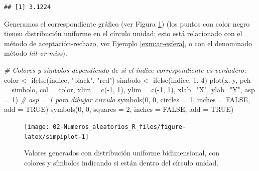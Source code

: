 \documentclass[
]{book}
\newenvironment{Shaded}{\begin{snugshade}}{\end{snugshade}}
\newcommand{\AttributeTok}[1]{\textcolor[rgb]{0.77,0.63,0.00}{#1}}
\newcommand{\CommentTok}[1]{\textcolor[rgb]{0.56,0.35,0.01}{\textit{#1}}}
\newcommand{\ConstantTok}[1]{\textcolor[rgb]{0.00,0.00,0.00}{#1}}
\newcommand{\DecValTok}[1]{\textcolor[rgb]{0.00,0.00,0.81}{#1}}
\newcommand{\FunctionTok}[1]{\textcolor[rgb]{0.00,0.00,0.00}{#1}}
\newcommand{\NormalTok}[1]{#1}
\newcommand{\OtherTok}[1]{\textcolor[rgb]{0.56,0.35,0.01}{#1}}
\newcommand{\SpecialCharTok}[1]{\textcolor[rgb]{0.00,0.00,0.00}{#1}}
\newcommand{\StringTok}[1]{\textcolor[rgb]{0.31,0.60,0.02}{#1}}
\theoremstyle{break}
\theoremstyle{definition}
\theoremstyle{definition}
\theoremstyle{definition}
\theoremstyle{definition}
\theoremstyle{remark}
\begin{document}
\begin{enumerate}
\begin{verbatim}
## [1] 3.1224
\end{verbatim}

  Generamos el correspondiente gráfico (ver Figura \ref{fig:simpiplot}) (los puntos con color negro tienen distribución uniforme en el círculo unidad; esto está relacionado con el método de aceptación-rechazo, ver Ejemplo \ref{exm:ar-esfera}, o con el denominado método \emph{hit-or-miss}).

\begin{Shaded}
\begin{Highlighting}[]
\CommentTok{\# Colores y símbolos dependiendo de si el índice correspondiente es verdadero:}
\NormalTok{color }\OtherTok{\textless{}{-}} \FunctionTok{ifelse}\NormalTok{(indice, }\StringTok{"black"}\NormalTok{, }\StringTok{"red"}\NormalTok{) }
\NormalTok{simbolo }\OtherTok{\textless{}{-}} \FunctionTok{ifelse}\NormalTok{(indice, }\DecValTok{1}\NormalTok{, }\DecValTok{4}\NormalTok{)}
\FunctionTok{plot}\NormalTok{(x, y, }\AttributeTok{pch =}\NormalTok{ simbolo, }\AttributeTok{col =}\NormalTok{ color, }
     \AttributeTok{xlim =} \FunctionTok{c}\NormalTok{(}\SpecialCharTok{{-}}\DecValTok{1}\NormalTok{, }\DecValTok{1}\NormalTok{), }\AttributeTok{ylim =} \FunctionTok{c}\NormalTok{(}\SpecialCharTok{{-}}\DecValTok{1}\NormalTok{, }\DecValTok{1}\NormalTok{), }\AttributeTok{xlab=}\StringTok{"X"}\NormalTok{, }\AttributeTok{ylab=}\StringTok{"Y"}\NormalTok{, }\AttributeTok{asp =} \DecValTok{1}\NormalTok{) }
     \CommentTok{\# asp = 1 para dibujar circulo}
\FunctionTok{symbols}\NormalTok{(}\DecValTok{0}\NormalTok{, }\DecValTok{0}\NormalTok{, }\AttributeTok{circles =} \DecValTok{1}\NormalTok{, }\AttributeTok{inches =} \ConstantTok{FALSE}\NormalTok{, }\AttributeTok{add =} \ConstantTok{TRUE}\NormalTok{)}
\FunctionTok{symbols}\NormalTok{(}\DecValTok{0}\NormalTok{, }\DecValTok{0}\NormalTok{, }\AttributeTok{squares =} \DecValTok{2}\NormalTok{, }\AttributeTok{inches =} \ConstantTok{FALSE}\NormalTok{, }\AttributeTok{add =} \ConstantTok{TRUE}\NormalTok{)}
\end{Highlighting}
\end{Shaded}

  \begin{figure}[!htb]

  {\centering \texttt{[image: 02-Numeros\_aleatorios\_R\_files/figure-latex/simpiplot-1]} 

  }

  \caption{Valores generados con distribución uniforme bidimensional, con colores y símbolos indicando si están dentro del círculo unidad.}\label{fig:simpiplot}
  \end{figure}
\end{enumerate}
\end{document}
